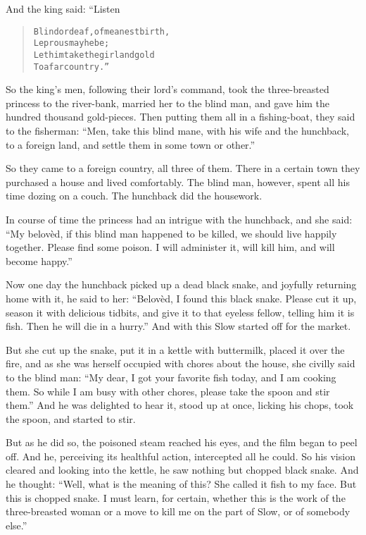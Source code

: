\documentclass[article, twoside, 14pt]{memoir}
\renewenvironment{verbatim}{%
\begin{quote}%
\vskip -10pt%
\begin{alltt}\normalfont\large}{\end{alltt}%
\end{quote}%
\vskip -10pt
} %
\begin{document}
And the king said: “Listen

\begin{verbatim}
Blind or deaf, of meanest birth,
    Leprous may he be;
Let him take the girl and gold
    To a far country.”
\end{verbatim}
So the king's men, following their lord's command, took the
three-breasted princess to the river-bank, married her to the blind
man, and gave him the hundred thousand gold-pieces. Then putting
them all in a fishing-boat, they said to the fisherman:
``Men, take this blind mane, with his wife and the hunchback, to a foreign land, and settle them in some town or other.''

So they came to a foreign country, all three of them. There in a
certain town they purchased a house and lived comfortably. The
blind man, however, spent all his time dozing on a couch. The
hunchback did the housework.

In course of time the princess had an intrigue with the hunchback,
and she said:
``My belovèd, if this blind man happened to be killed, we should live happily together. Please find some poison. I will administer it, will kill him, and will become happy.''

Now one day the hunchback picked up a dead black snake, and
joyfully returning home with it, he said to her:
``Belovèd, I found this black snake. Please cut it up, season it with delicious tidbits, and give it to that eyeless fellow, telling him it is fish. Then he will die in a hurry.''
And with this Slow started off for the market.

But she cut up the snake, put it in a kettle with buttermilk,
placed it over the fire, and as she was herself occupied with
chores about the house, she civilly said to the blind man:
``My dear, I got your favorite fish today, and I am cooking them. So while I am busy with other chores, please take the spoon and stir them.''
And he was delighted to hear it, stood up at once, licking his
chops, took the spoon, and started to stir.

But as he did so, the poisoned steam reached his eyes, and the film
began to peel off. And he, perceiving its healthful action,
intercepted all he could. So his vision cleared and looking into
the kettle, he saw nothing but chopped black snake. And he thought:
``Well, what is the meaning of this? She called it fish to my face. But this is chopped snake. I must learn, for certain, whether this is the work of the three-breasted woman or a move to kill me on the part of Slow, or of somebody else.''
\end{document}
